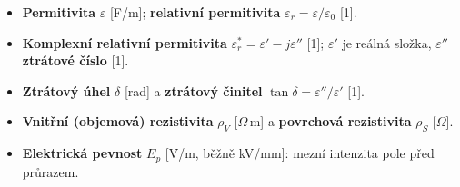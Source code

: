\begin{itemize}
\item \textbf{Permitivita} $\varepsilon$ [F/m]; \textbf{relativní permitivita} $\varepsilon_r=\varepsilon/\varepsilon_0$ [1].
\item \textbf{Komplexní relativní permitivita} $\varepsilon_r^*=\varepsilon'-j\varepsilon''$ [1]; $\varepsilon'$ je reálná složka, $\varepsilon''$ \textbf{ztrátové číslo} [1].
\item \textbf{Ztrátový úhel} $\delta$ [rad] a \textbf{ztrátový činitel} $\tan\delta=\varepsilon''/\varepsilon'$ [1].
\item \textbf{Vnitřní (objemová) rezistivita} $\rho_V$ [$\Omega$\,m] a \textbf{povrchová rezistivita} $\rho_S$ [$\Omega$].
\item \textbf{Elektrická pevnost} $E_p$ [V/m, běžně kV/mm]: mezní intenzita pole před průrazem.
\end{itemize}
